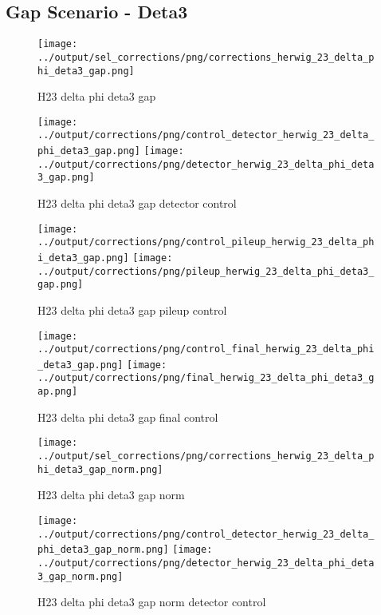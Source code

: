 \documentclass[11pt]{book}
\begin{document}
\clearpage
\subsection{Gap Scenario - Deta3}
\begin{figure}[ht]
\centering
\texttt{[image: ../output/sel\_corrections/png/corrections\_herwig\_23\_delta\_phi\_deta3\_gap.png]}
\caption{H23 delta phi deta3 gap}
\label{fig:H23_delta_phi_deta3_gap}
\end{figure}

\begin{figure}[ht]
\centering
\texttt{[image: ../output/corrections/png/control\_detector\_herwig\_23\_delta\_phi\_deta3\_gap.png]}
\texttt{[image: ../output/corrections/png/detector\_herwig\_23\_delta\_phi\_deta3\_gap.png]}
\caption{H23 delta phi deta3 gap detector control}
\label{fig:H23_delta_phi_deta3_gap_detector_control}
\end{figure}

\begin{figure}[ht]
\centering
\texttt{[image: ../output/corrections/png/control\_pileup\_herwig\_23\_delta\_phi\_deta3\_gap.png]}
\texttt{[image: ../output/corrections/png/pileup\_herwig\_23\_delta\_phi\_deta3\_gap.png]}
\caption{H23 delta phi deta3 gap pileup control}
\label{fig:H23_delta_phi_deta3_gap_pileup_control}
\end{figure}


\begin{figure}[ht]
\centering
\texttt{[image: ../output/corrections/png/control\_final\_herwig\_23\_delta\_phi\_deta3\_gap.png]}
\texttt{[image: ../output/corrections/png/final\_herwig\_23\_delta\_phi\_deta3\_gap.png]}
\caption{H23 delta phi deta3 gap final control}
\label{fig:H23_delta_phi_deta3_gap_final_control}
\end{figure}


\begin{figure}[ht]
\centering
\texttt{[image: ../output/sel\_corrections/png/corrections\_herwig\_23\_delta\_phi\_deta3\_gap\_norm.png]}
\caption{H23 delta phi deta3 gap norm}
\label{fig:H23_delta_phi_deta3_gap_norm}
\end{figure}

\begin{figure}[ht]
\centering
\texttt{[image: ../output/corrections/png/control\_detector\_herwig\_23\_delta\_phi\_deta3\_gap\_norm.png]}
\texttt{[image: ../output/corrections/png/detector\_herwig\_23\_delta\_phi\_deta3\_gap\_norm.png]}
\caption{H23 delta phi deta3 gap norm detector control}
\label{fig:H23_delta_phi_deta3_gap_norm_detector_control}
\end{figure}
\end{document}
